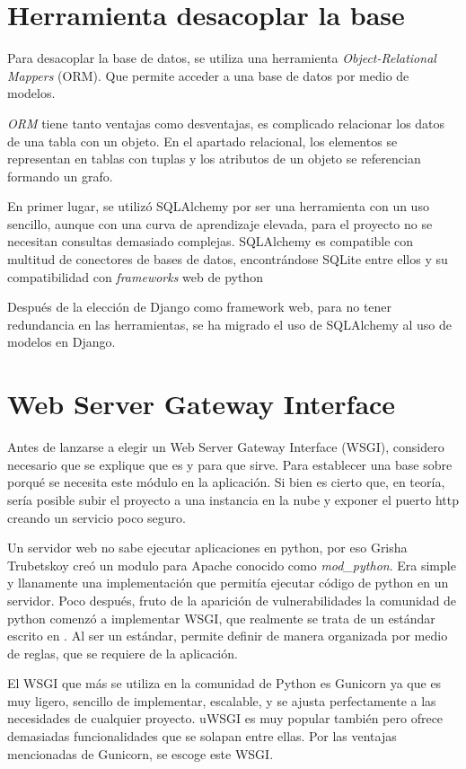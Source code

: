\section{Herramienta desacoplar la \gls{base}}
Para desacoplar la base de datos, se utiliza una herramienta \emph{Object-Relational Mappers} (ORM). Que permite acceder a una base de datos por medio de modelos. 

\emph{ORM} tiene tanto ventajas como desventajas, es complicado relacionar los datos de una tabla con un objeto. En el apartado relacional, los elementos se representan en tablas con tuplas y los atributos de un objeto se referencian formando un grafo. 

En primer lugar, se utilizó SQLAlchemy por ser una herramienta con un uso sencillo, aunque con una curva de aprendizaje elevada, para el proyecto no se necesitan consultas demasiado complejas. SQLAlchemy es compatible con multitud de conectores de bases de datos, encontrándose SQLite entre ellos y su compatibilidad con \emph{frameworks} web de \gls{python} \cite{orm2023}

Después de la elección de Django como framework web, para no tener redundancia en las herramientas, se ha migrado el uso de SQLAlchemy al uso de modelos en Django. 

\section{Web Server Gateway Interface}
Antes de lanzarse a elegir un Web Server Gateway Interface (WSGI), considero necesario que se explique que es y para que sirve. Para establecer una base sobre porqué se necesita este módulo en la aplicación. Si bien es cierto que, en teoría, sería posible subir el proyecto a una instancia en la nube y exponer el puerto \gls{http} creando un servicio poco seguro.

Un servidor web no sabe ejecutar aplicaciones en python, por eso Grisha Trubetskoy creó un modulo para Apache conocido como \textit{mod\_python}. Era simple y llanamente una implementación que permitía ejecutar código de python en un servidor. Poco después, fruto de la aparición de vulnerabilidades la comunidad de python comenzó a implementar WSGI, que realmente se trata de un estándar escrito en . Al ser un estándar, permite definir de manera organizada por medio de reglas, que se requiere de la aplicación. 

El WSGI que más se utiliza en la comunidad de Python es Gunicorn ya que es muy ligero, sencillo de implementar, escalable, y se ajusta perfectamente a las necesidades de cualquier proyecto. uWSGI es muy popular también pero ofrece demasiadas funcionalidades que se solapan entre ellas. Por las ventajas mencionadas de Gunicorn, se escoge este WSGI.

